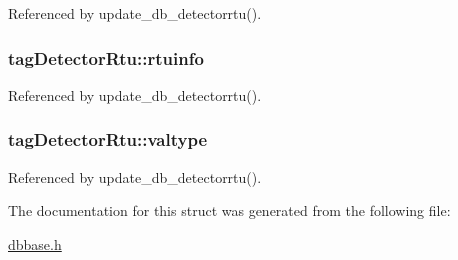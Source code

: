 Referenced by update\-\_\-db\-\_\-detectorrtu().

\hypertarget{structtagDetectorRtu_a9ad49016d3a6175a0433542958700191}{
\subsubsection[{rtuinfo}]{ tag\-Detector\-Rtu\-::rtuinfo}}\label{structtagDetectorRtu_a9ad49016d3a6175a0433542958700191}


Referenced by update\-\_\-db\-\_\-detectorrtu().

\hypertarget{structtagDetectorRtu_a0f28dc3321e8b27c35cea8c6744b254c}{
\subsubsection[{valtype}]{ tag\-Detector\-Rtu\-::valtype}}\label{structtagDetectorRtu_a0f28dc3321e8b27c35cea8c6744b254c}


Referenced by update\-\_\-db\-\_\-detectorrtu().



The documentation for this struct was generated from the following file\-:\begin{DoxyCompactItemize}
\item 
\hyperlink{dbbase_8h}{dbbase.\-h}\end{DoxyCompactItemize}
